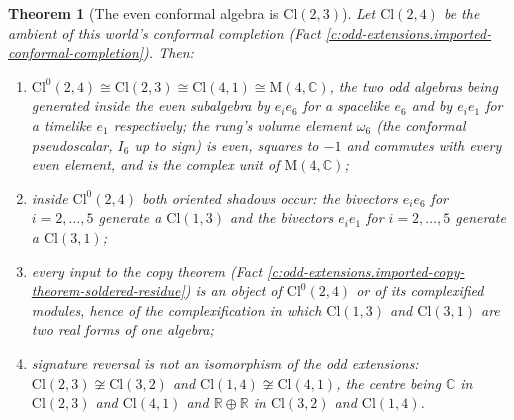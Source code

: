 \documentclass[11pt]{article}
\newtheorem{theorem}{Theorem}[section]
\theoremstyle{definition}
\theoremstyle{plain}
\newcommand{\changedmark}[2]{\marginpar{\raggedright\scriptsize\color{#1}#2}}
\providecommand{\C}{}\renewcommand{\C}{\mathbb{C}}
\providecommand{\Cl}{}\renewcommand{\Cl}{\mathrm{Cl}}
\providecommand{\Mat}{}\renewcommand{\Mat}{\mathrm{M}}
\providecommand{\R}{}\renewcommand{\R}{\mathbb{R}}
\begin{document}
\begin{theorem}[The even conformal algebra is $\Cl(2,3)$]\label{c:odd-extensions.twistor-algebra}
\changedmark{gray}{reworded}
Let $\Cl(2,4)$ be the ambient of this world's conformal completion (Fact \ref{c:odd-extensions.imported-conformal-completion}). Then:
\begin{enumerate}
\item[(i)] $\Cl^{0}(2,4) \cong \Cl(2,3) \cong \Cl(4,1) \cong \Mat(4,\C)$, the two odd algebras being generated inside the even subalgebra by $e_{i}e_{6}$ for a spacelike $e_{6}$ and by $e_{i}e_{1}$ for a timelike $e_{1}$ respectively; the rung's volume element $\omega_{6}$ (the conformal pseudoscalar, $I_6$ up to sign) is even, squares to $-1$ and commutes with every even element, and is the complex unit of $\Mat(4,\C)$;
\item[(ii)] inside $\Cl^{0}(2,4)$ both oriented shadows occur: the bivectors $e_{i}e_{6}$ for $i = 2, \ldots, 5$ generate a $\Cl(1,3)$ and the bivectors $e_{i}e_{1}$ for $i = 2, \ldots, 5$ generate a $\Cl(3,1)$;
\item[(iii)] every input to the copy theorem (Fact \ref{c:odd-extensions.imported-copy-theorem-soldered-residue}) is an object of $\Cl^{0}(2,4)$ or of its complexified modules, hence of the complexification in which $\Cl(1,3)$ and $\Cl(3,1)$ are two real forms of one algebra;
\item[(iv)] signature reversal is not an isomorphism of the odd extensions: $\Cl(2,3) \not\cong \Cl(3,2)$ and $\Cl(1,4) \not\cong \Cl(4,1)$, the centre being $\C$ in $\Cl(2,3)$ and $\Cl(4,1)$ and $\R \oplus \R$ in $\Cl(3,2)$ and $\Cl(1,4)$.
\end{enumerate}
\end{theorem}
\end{document}
